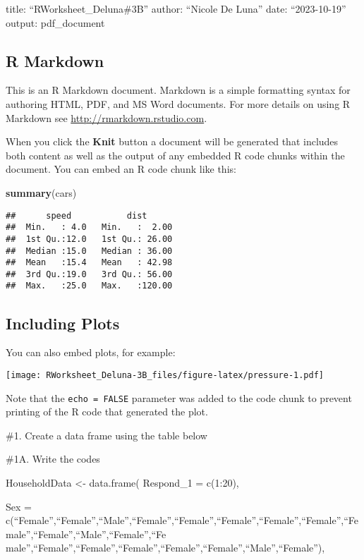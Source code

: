 \documentclass[
]{article}
\author{}
\date{\vspace{-2.5em}}
\newenvironment{Shaded}{\begin{snugshade}}{\end{snugshade}}
\newcommand{\FunctionTok}[1]{\textcolor[rgb]{0.13,0.29,0.53}{\textbf{#1}}}
\newcommand{\NormalTok}[1]{#1}
\begin{document}
title: ``RWorksheet\_Deluna\#3B'' author: ``Nicole De Luna'' date:
``2023-10-19'' output: pdf\_document

\hypertarget{r-markdown}{%
\subsection{R Markdown}\label{r-markdown}}

This is an R Markdown document. Markdown is a simple formatting syntax
for authoring HTML, PDF, and MS Word documents. For more details on
using R Markdown see \url{http://rmarkdown.rstudio.com}.

When you click the \textbf{Knit} button a document will be generated
that includes both content as well as the output of any embedded R code
chunks within the document. You can embed an R code chunk like this:

\begin{Shaded}
\begin{Highlighting}[]
\FunctionTok{summary}\NormalTok{(cars)}
\end{Highlighting}
\end{Shaded}

\begin{verbatim}
##      speed           dist       
##  Min.   : 4.0   Min.   :  2.00  
##  1st Qu.:12.0   1st Qu.: 26.00  
##  Median :15.0   Median : 36.00  
##  Mean   :15.4   Mean   : 42.98  
##  3rd Qu.:19.0   3rd Qu.: 56.00  
##  Max.   :25.0   Max.   :120.00
\end{verbatim}

\hypertarget{including-plots}{%
\subsection{Including Plots}\label{including-plots}}

You can also embed plots, for example:

\texttt{[image: RWorksheet\_Deluna-3B\_files/figure-latex/pressure-1.pdf]}

Note that the \texttt{echo\ =\ FALSE} parameter was added to the code
chunk to prevent printing of the R code that generated the plot.

\#1. Create a data frame using the table below

\#1A. Write the codes

HouseholdData \textless- data.frame( Respond\_1 = c(1:20),

Sex =
c(``Female'',``Female'',``Male'',``Female'',``Female'',``Female'',``Female'',``Female'',``Female'',``Female'',``Male'',``Female'',``Fe
male'',``Female'',``Female'',``Female'',``Female'',``Female'',``Male'',``Female''),
\end{document}
